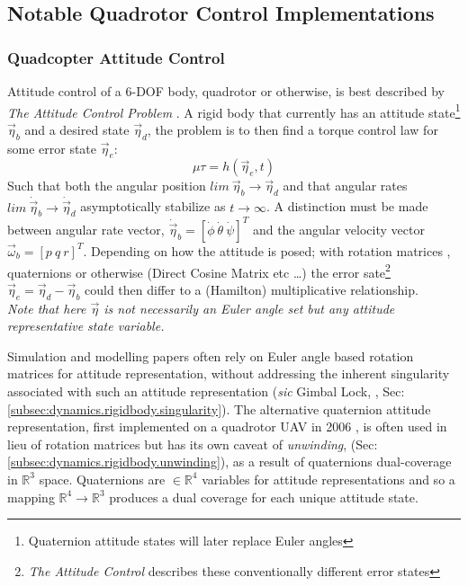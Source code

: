 \subsection{Notable Quadrotor Control Implementations}
\label{subsec:intro.lit.control}
\subsubsection*{Quadcopter Attitude Control}
Attitude control of a 6-DOF body, quadrotor or otherwise, is best described by \emph{The Attitude Control Problem} \cite{attitudecontrolproblem}. A rigid body that currently has an attitude state\footnote{Quaternion attitude states will later replace Euler angles} $\vec{\eta}_b$ and a desired state $\vec{\eta}_d$, the problem is to then find a torque control law for some error state $\vec{\eta}_e$:
\begin{equation} \label{eq:2}
\mu\tau = h(\vec{\eta}_e,t)
\end{equation}
Such that both the angular position $lim~\vec{\eta}_b \rightarrow \vec{\eta}_d$ and that angular rates $lim~\dot{\vec{\eta}}_b \rightarrow \dot{\vec{\eta}}_d$ asymptotically stabilize as $t \rightarrow \infty$. A distinction must be made between angular rate vector, $\dot{\vec{\eta}}_b=[\dot{\phi}~\dot{\theta}~\dot{\psi}]^T$ and the angular velocity vector $\vec{\omega}_b=[p~q~r]^T$. Depending on how the attitude is posed; with rotation matrices \cite{rigidbodylecture,eulerrigidbody,rotationsequences}, quaternions \cite{quaterniondynamics, rotationsequences, spacecraftattitutdequaternions,fullquaternion} or otherwise (Direct Cosine Matrix etc \ldots) the error sate\footnote{\emph{The Attitude Control} \cite{attitudecontrolproblem} describes these conventionally different error states} $\vec{\eta}_e= \vec{\eta}_d - \vec{\eta}_b$ could then differ to a (Hamilton) multiplicative relationship.
\\
\emph{\color{Gray}Note that here $\vec{\eta}$ is not necessarily an Euler angle set but any attitude representative state variable.}
\par
Simulation and modelling papers often rely on Euler angle based rotation matrices for attitude representation, \cite{adaptivedisturbancecontrol, optimizedpidquadcopter, singleaxistilting, backsteppingquadcoptercontrol, fullquadcoptercontrol} without addressing the inherent singularity associated with such an attitude representation (\emph{sic} Gimbal Lock, \cite{euleranglesingularity}, Sec:\ref{subsec:dynamics.rigidbody.singularity}). The alternative quaternion attitude representation, first implemented on a quadrotor UAV in 2006 \cite{attitudestabilization}, is often used in lieu of rotation matrices but has its own caveat of \emph{unwinding}, (Sec:\ref{subsec:dynamics.rigidbody.unwinding}), as a result of quaternions dual-coverage \cite{unwinding} in $\mathbb{R}^3$ space. Quaternions are $\in\mathbb{R}^4$ variables for attitude representations and so a mapping $\mathbb{R}^4\rightarrow\mathbb{R}^3$ produces a dual coverage for each unique attitude state.

